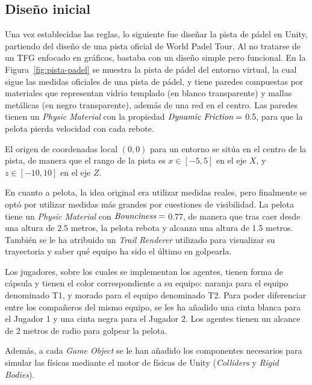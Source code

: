 \subsection{Diseño inicial}
Una vez establecidas las reglas, lo siguiente fue diseñar la pista de pádel en Unity, partiendo del diseño de una pista oficial de World Padel Tour. Al no tratarse de un TFG enfocado en gráficos, bastaba con un diseño simple pero funcional. En la Figura~\ref{fig:pista-padel} se muestra la pista de pádel del entorno virtual, la cual sigue las medidas oficiales de una pista de pádel, y tiene paredes compuestas por materiales que representan vidrio templado (en blanco transparente) y mallas metálicas (en negro transparente), además de una red en el centro. Las paredes tienen un \emph{Physic Material} con la propiedad $\emph{Dynamic Friction}=$ 0.5, para que la pelota pierda velocidad con cada rebote.

El origen de coordenadas local $(0,0)$ para un entorno se sitúa en el centro de la pista, de manera que el rango de la pista es $x \in [-5, 5]$ en el eje $X$, y $z \in [-10, 10]$ en el eje $Z$.

En cuanto a pelota, la idea original era utilizar medidas reales, pero finalmente se optó por utilizar medidas más grandes por cuestiones de visibilidad. La pelota tiene un \emph{Physic Material} con $\emph{Bounciness}=$ 0.77, de manera que tras caer desde una altura de 2.5 metros, la pelota rebota y alcanza una altura de 1.5 metros. También se le ha atribuido un \emph{Trail Renderer} utilizado para visualizar su trayectoria y saber qué equipo ha sido el último en golpearla.

Los jugadores, sobre los cuales se implementan los agentes, tienen forma de cápsula y tienen el color correspondiente a su equipo: naranja para el equipo denominado T1, y morado para el equipo denominado T2. Para poder diferenciar entre los compañeros del mismo equipo, se les ha añadido una cinta blanca para el Jugador 1 y una cinta negra para el Jugador 2. Los agentes tienen un alcance de 2 metros de radio para golpear la pelota.

Además, a cada \emph{Game Object} se le han añadido los componentes necesarios para simular las físicas mediante el motor de físicas de Unity (\emph{Colliders} y \emph{Rigid Bodies}).

